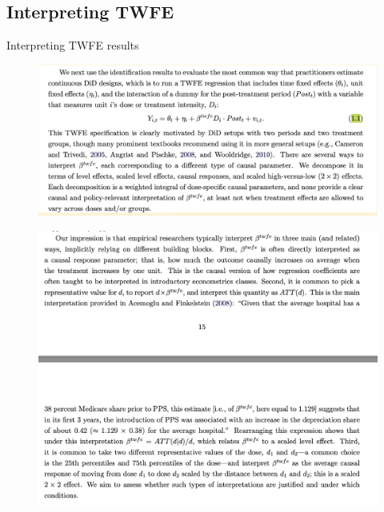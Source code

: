 \documentclass{beamer}
\begin{document}
\subsection{Interpreting TWFE}

\begin{frame}{Interpreting TWFE results}

\begin{figure}
\begin{center}
             \includegraphics[scale=0.45]{./lecture_includes/continuous8.png}
\end{center}
\end{figure}

\end{frame}


\begin{frame}

\begin{figure}
\begin{center}
             \includegraphics[scale=0.35]{./lecture_includes/continuous12.png}
\end{center}
\end{figure}

\end{frame}
\end{document}
